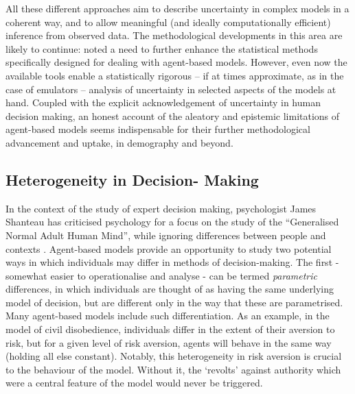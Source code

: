 \documentclass{article}
\begin{document}
All these different approaches aim to describe uncertainty in complex models in a coherent way, and to allow meaningful (and ideally computationally efficient) inference from observed data. The methodological developments in this area are likely to continue: \citet{Heard2015} noted a need to further enhance the statistical methods specifically designed for dealing with agent-based models. However, even now the available tools enable a statistically rigorous -- if at times approximate, as in the case of emulators -- analysis of uncertainty in selected aspects of the models at hand. Coupled with the explicit acknowledgement of uncertainty in human decision making, an honest account of the aleatory and epistemic limitations of agent-based models seems indispensable for their further methodological advancement and uptake, in demography and beyond.

\subsection{Heterogeneity in Decision-
Making}\label{heterogeneity-in-decision-strategies}

In the context of the study of expert decision making, psychologist James Shanteau has criticised psychology for a focus on the study of the ``Generalised Normal Adult Human Mind'', while ignoring differences between people and contexts \citep{Shanteau2015}. Agent-based models provide an opportunity to study two potential ways in which individuals may differ in methods of decision-making. The first - somewhat easier to operationalise and analyse - can be termed \emph{parametric} differences, in which individuals are thought of as having the same underlying model of decision, but are different only in the way that these are parametrised. Many agent-based models include such differentiation. As an example, in the \citet{Epstein2002} model of civil disobedience, individuals differ in the extent of their aversion to risk, but for a given level of risk aversion, agents will behave in the same way (holding all else constant). Notably, this heterogeneity in risk aversion is crucial to the behaviour of the model. Without it, the `revolts' against authority which were a central feature of the model would never be triggered.
\end{document}

